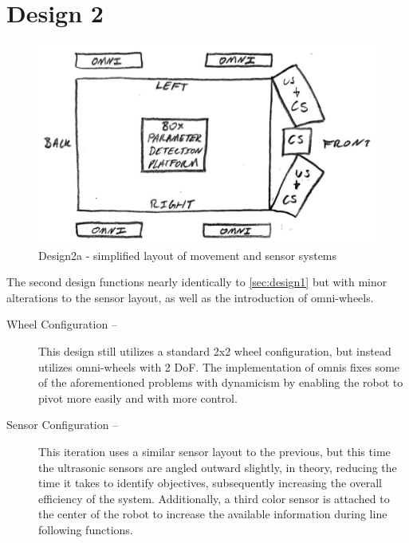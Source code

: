 \documentclass[11pt]{report}
\begin{document}
\newpage
\section{Design 2}\label{sec:design2}
\begin{figure}[H]
    \centering
    \hspace*{2em}
    \includegraphics[width=0.5\linewidth]{Images//Designs/Design2a.pdf}
    \caption{Design2a - simplified layout of movement and sensor systems}
    \label{fig:design2a}
\end{figure}
The second design functions nearly identically to \cref{sec:design1} but with minor alterations to the sensor layout, as well as the introduction of \gls{omni}-wheels.

\begin{description}
    \item[Wheel Configuration --] This design still utilizes a standard 2x2 wheel configuration, but instead utilizes \gls{omni}-wheels with 2 \gls{DoF}. The implementation of \glspl{omni} fixes some of the aforementioned problems with dynamicism by enabling the robot to pivot more easily and with more control.
    \item[Sensor Configuration --] This iteration uses a similar sensor layout to the previous, but this time the ultrasonic sensors are angled outward slightly, in theory, reducing the time it takes to identify objectives, subsequently increasing the overall efficiency of the system. Additionally, a third color sensor is attached to the center of the robot to increase the available information during line following functions.
\end{description}
\end{document}
